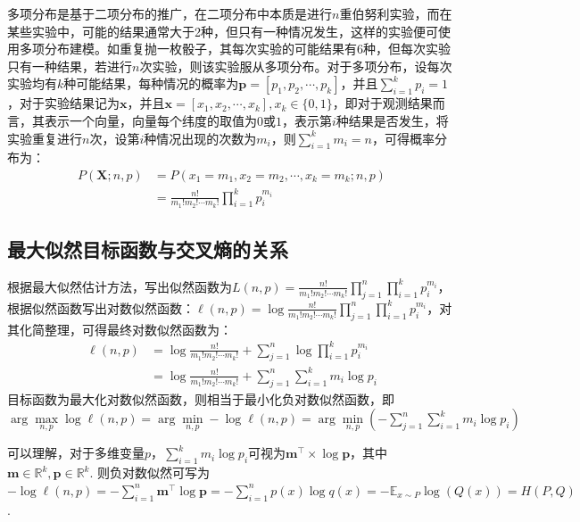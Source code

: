 \documentclass[12pt,a4paper]{article}
\begin{document}
  多项分布是基于二项分布的推广，在二项分布中本质是进行$n$重伯努利实验，而在某些实验中，可能的结果通常大于2种，但只有一种情况发生，这样的实验便可使用多项分布建模。如重复抛一枚骰子，其每次实验的可能结果有6种，但每次实验只有一种结果，若进行$n$次实验，则该实验服从多项分布。对于多项分布，设每次实验均有$k$种可能结果，每种情况的概率为$\mathbf{p}=\left[p_1,p_2,\cdots,p_k\right]$，并且$\sum\limits_{i=1}^k p_i = 1$，对于实验结果记为$\mathbf{x}$，并且$\mathbf{x}=\left[x_1, x_2,\cdots, x_k\right], x_k\in \{0, 1\}$，即对于观测结果而言，其表示一个向量，向量每个纬度的取值为$0$或$1$，表示第$i$种结果是否发生，将实验重复进行$n$次，设第$i$种情况出现的次数为$m_i$，则$\sum\limits_{i=1}^k m_i = n$，可得概率分布为：
  $$
  \begin{aligned}
    P(\mathbf{X};n,p)&=P(x_1=m_1,x_2=m_2,\cdots,x_k=m_k;n, p) \\ 
    &=\frac{n!}{m_1!m_2!\cdots m_k!}\prod\limits_{i=1}^k p_i^{m_i}
  \end{aligned}
  $$

  \subsection{最大似然目标函数与交叉熵的关系}

  根据最大似然估计方法，写出似然函数为$L(n,p)=\frac{n!}{m_1!m_2!\cdots m_k!}\prod\limits_{j=1}^n\prod\limits_{i=1}^k p_i^{m_i}$，根据似然函数写出对数似然函数：$\ell(n,p)=\log\frac{n!}{m_1!m_2!\cdots m_k!}\prod\limits_{j=1}^n\prod\limits_{i=1}^k p_i^{m_i}$，对其化简整理，可得最终对数似然函数为：
  $$
  \begin{aligned}
    \ell(n,p)&=\log \frac{n!}{m_1!m_2!\cdots m_k!} + \sum\limits_{j=1}^n \log \prod \limits _{i=1}^k p_i^{m_i} \\
    &= \log \frac{n!}{m_1!m_2!\cdots m_k!} + \sum\limits_{j=1}^n \sum\limits _{i=1}^k m_i \log p_i
  \end{aligned}
  $$
  目标函数为最大化对数似然函数，则相当于最小化负对数似然函数，即$\arg\max\limits_{n,p}\log \ell(n,p)=\arg\min\limits_{n,p}-\log \ell(n,p)=\arg\min\limits_{n,p} \left(-\sum\limits_{j=1}^n \sum\limits _{i=1}^k m_i \log p_i\right)$

  可以理解，对于多维变量$\mathbf{}{p}$，$\sum\limits _{i=1}^k m_i \log p_i$可视为$\mathbf{m}^\top \times \log\mathbf{p}$，其中$\mathbf{m}\in \mathbb{R}^{k}, \mathbf{p}\in \mathbb{R}^k$. 则负对数似然可写为$-\log \ell(n,p)=-\sum\limits_{i=1}^n \mathbf{m}^\top \log \mathbf{p}=-\sum\limits_{i=1}^n p(x) \log q(x)=-\mathbb{E}_{x\sim P} \log(Q(x))=H(P,Q)$.
\end{document}
